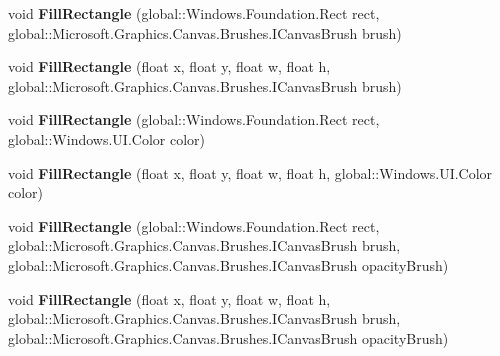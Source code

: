 \begin{DoxyCompactItemize}
\mbox{\label{interface_microsoft_1_1_graphics_1_1_canvas_1_1_i_canvas_drawing_session_aad333fe9cc512391f9d24c3f715ed511}} 
void {\bfseries Fill\+Rectangle} (global\+::\+Windows.\+Foundation.\+Rect rect, global\+::\+Microsoft.\+Graphics.\+Canvas.\+Brushes.\+I\+Canvas\+Brush brush)
\item 
\mbox{\label{interface_microsoft_1_1_graphics_1_1_canvas_1_1_i_canvas_drawing_session_a2a2999da33b0d1f6811b4606a6eb61c3}} 
void {\bfseries Fill\+Rectangle} (float x, float y, float w, float h, global\+::\+Microsoft.\+Graphics.\+Canvas.\+Brushes.\+I\+Canvas\+Brush brush)
\item 
\mbox{\label{interface_microsoft_1_1_graphics_1_1_canvas_1_1_i_canvas_drawing_session_af900874c2935bdf5765d740b10e6db49}} 
void {\bfseries Fill\+Rectangle} (global\+::\+Windows.\+Foundation.\+Rect rect, global\+::\+Windows.\+U\+I.\+Color color)
\item 
\mbox{\label{interface_microsoft_1_1_graphics_1_1_canvas_1_1_i_canvas_drawing_session_a48d32f42bda232e54791b004f6a8f5bd}} 
void {\bfseries Fill\+Rectangle} (float x, float y, float w, float h, global\+::\+Windows.\+U\+I.\+Color color)
\item 
\mbox{\label{interface_microsoft_1_1_graphics_1_1_canvas_1_1_i_canvas_drawing_session_a519f2365cff391980d84e50b7fd2f444}} 
void {\bfseries Fill\+Rectangle} (global\+::\+Windows.\+Foundation.\+Rect rect, global\+::\+Microsoft.\+Graphics.\+Canvas.\+Brushes.\+I\+Canvas\+Brush brush, global\+::\+Microsoft.\+Graphics.\+Canvas.\+Brushes.\+I\+Canvas\+Brush opacity\+Brush)
\item 
\mbox{\label{interface_microsoft_1_1_graphics_1_1_canvas_1_1_i_canvas_drawing_session_abb7c5787d15df087bbf5ae6bb24d087b}} 
void {\bfseries Fill\+Rectangle} (float x, float y, float w, float h, global\+::\+Microsoft.\+Graphics.\+Canvas.\+Brushes.\+I\+Canvas\+Brush brush, global\+::\+Microsoft.\+Graphics.\+Canvas.\+Brushes.\+I\+Canvas\+Brush opacity\+Brush)

\end{DoxyCompactItemize}
